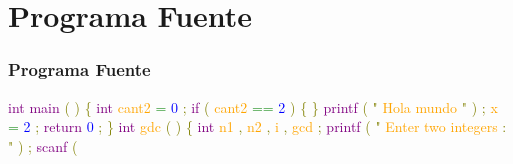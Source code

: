 \documentclass{beamer}
\begin{document}
\section{Programa Fuente}\begin{frame}[allowframebreaks] 
\frametitle{Programa Fuente} 
\newline 
\newline 
\newline 
\textcolor{purple}{ int } 
\textcolor{purple}{ main } 
\textcolor{olive}{ ( } 
\textcolor{olive}{ ) } 
\newline 
\textcolor{olive}{ \{ } 
\textcolor{purple}{ int } 
\textcolor{orange}{ cant2 } 
\textcolor{green}{ = } 
\textcolor{blue}{ 0 } 
\textcolor{olive}{ ; } 
\newline 
\textcolor{purple}{ if } 
\textcolor{olive}{ ( } 
\textcolor{orange}{ cant2 } 
\textcolor{green}{ == } 
\textcolor{blue}{ 2 } 
\textcolor{olive}{ ) } 
\textcolor{olive}{ \{ } 
\textcolor{olive}{\} } 
\newline 
\textcolor{purple}{ printf } 
\textcolor{olive}{ ( } 
\textcolor{olive}{ " } 
\textcolor{orange}{ Hola } 
\textcolor{orange}{ mundo } 
\textcolor{olive}{ " } 
\textcolor{olive}{ ) } 
\textcolor{olive}{ ; } 
\newline 
\textcolor{orange}{ x } 
\textcolor{green}{ = } 
\textcolor{blue}{ 2 } 
\textcolor{olive}{ ; } 
\newline 
\textcolor{purple}{ return } 
\textcolor{blue}{ 0 } 
\textcolor{olive}{ ; } 
\newline 
\textcolor{olive}{\} } 
\newline 
\newline 
\textcolor{purple}{ int } 
\textcolor{orange}{ gdc } 
\textcolor{olive}{ ( } 
\textcolor{olive}{ ) } 
\newline 
\textcolor{olive}{ \{ } 
\newline 
\textcolor{purple}{ int } 
\textcolor{orange}{ n1 } 
\textcolor{olive}{ , } 
\textcolor{orange}{ n2 } 
\textcolor{olive}{ , } 
\textcolor{orange}{ i } 
\textcolor{olive}{ , } 
\textcolor{orange}{ gcd } 
\textcolor{olive}{ ; } 
\newline 
\newline 
\textcolor{purple}{ printf } 
\textcolor{olive}{ ( } 
\textcolor{olive}{ " } 
\textcolor{orange}{ Enter } 
\textcolor{orange}{ two } 
\textcolor{orange}{ integers } 
\textcolor{olive}{ : } 
\textcolor{olive}{ " } 
\textcolor{olive}{ ) } 
\textcolor{olive}{ ; } 
\newline 
\textcolor{purple}{ scanf } 
\textcolor{olive}{ ( } 

\end{frame}
\end{document}
